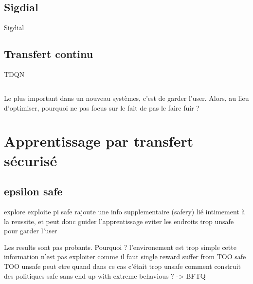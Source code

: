 \documentclass[french]{beamer}
\begin{document}
    \subsection{Sigdial}

    \begin{frame}
        Sigdial
    \end{frame}

    \subsection{Transfert continu}

    \begin{frame}

        TDQN

    \end{frame}

    \subsection{}

    \begin{frame}
        Le plus important dans un nouveau systèmes, c'est de garder l'user. Alors, au lieu d'optimiser, pourquoi ne pas focus sur le fait de pas le faire fuir ?
    \end{frame}

    \section{Apprentissage par transfert sécurisé}

    \subsection{epsilon safe}
    \begin{frame}

        explore
        exploite
        pi safe
        rajoute une info supplementaire (safery) lié intimement à la reussite, et peut donc guider l'apprentissage
        eviter les endroits trop unsafe pour garder l'user
    \end{frame}

    \begin{frame}
        Les results sont pas probants.
        Pourquoi ?
        l'environement est trop simple
        cette information n'est pas exploiter comme il faut
        single reward suffer from TOO safe TOO unsafe
        peut etre quand dans ce cas c'était trop unsafe
        comment construit des politiques safe sans end up with extreme behavious ? -> BFTQ
    \end{frame}
\end{document}
